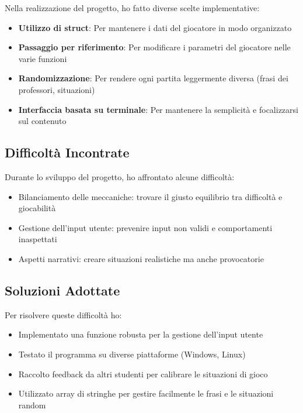 \documentclass[a4paper,12pt]{article}
\begin{document}
Nella realizzazione del progetto, ho fatto diverse scelte implementative:

\begin{itemize}
    \item \textbf{Utilizzo di struct}: Per mantenere i dati del giocatore in modo organizzato
    \item \textbf{Passaggio per riferimento}: Per modificare i parametri del giocatore nelle varie funzioni
    \item \textbf{Randomizzazione}: Per rendere ogni partita leggermente diversa (frasi dei professori, situazioni)
    \item \textbf{Interfaccia basata su terminale}: Per mantenere la semplicità e focalizzarsi sul contenuto
\end{itemize}

\subsection{Difficoltà Incontrate}

Durante lo sviluppo del progetto, ho affrontato alcune difficoltà:

\begin{itemize}
    \item Bilanciamento delle meccaniche: trovare il giusto equilibrio tra difficoltà e giocabilità
    \item Gestione dell'input utente: prevenire input non validi e comportamenti inaspettati
    \item Aspetti narrativi: creare situazioni realistiche ma anche provocatorie
\end{itemize}

\subsection{Soluzioni Adottate}

Per risolvere queste difficoltà ho:

\begin{itemize}
    \item Implementato una funzione robusta per la gestione dell'input utente
    \item Testato il programma su diverse piattaforme (Windows, Linux)
    \item Raccolto feedback da altri studenti per calibrare le situazioni di gioco
    \item Utilizzato array di stringhe per gestire facilmente le frasi e le situazioni random
\end{itemize}
\end{document}
